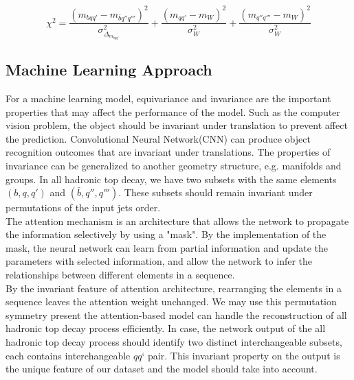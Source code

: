 \begin{equation}
	\chi^{2} = \frac{(m_{bqq'} - m_{\bar{b}q''q'''})^{2}}{\sigma^{2}_{\Delta_{m_{bqq'}}}}  + \frac{(m_{qq'} - m_{W})^{2}}{\sigma^{2}_{W}} + \frac{(m _{q''q'''} - m_{W})^{2}}{\sigma^{2}_{W}}
\end{equation} 


\subsection{Machine Learning Approach}\label{subsec:ML approach}

For a machine learning model, equivariance and invariance are the important properties that may affect the performance of the model. Such as the computer vision problem, the object should be invariant under translation to prevent affect the prediction. Convolutional Neural Network(CNN) can produce object recognition outcomes that are invariant under translations. The properties of invariance can be generalized to another geometry structure, e.g. manifolds and groups. In all hadronic top decay, we have two subsets with the same elements $(b, q, q')$ and $(\bar{b}, q'', q''')$. These subsets should remain invariant under permutations of the input jets order. 
\\
The attention mechanism is an architecture that allows the network to propagate the information selectively by using a "mask". By the implementation of the mask, the neural network can learn from partial information and update the parameters with selected information, and allow the network to infer the relationships between different elements in a sequence.
\\
By the invariant feature of attention architecture, rearranging the elements in a sequence leaves the attention weight unchanged. We may use this permutation symmetry present the attention-based model can handle the reconstruction of all hadronic top decay process efficiently. In case, the network output of the all hadronic top decay process should identify two distinct interchangeable subsets, each contains interchangeable $qq‘$ pair. This invariant property on the output is the unique feature of our dataset and the model should take into account. 
\\

